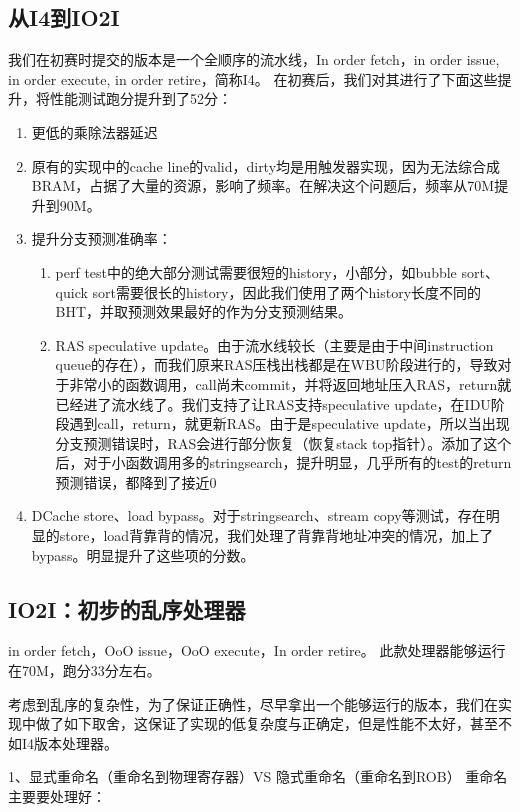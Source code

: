 \documentclass[lang=cn,11pt,a4paper]{elegantpaper}
\begin{document}
\subsection{从I4到IO2I}
我们在初赛时提交的版本是一个全顺序的流水线，In order fetch，in order issue, in order execute, in order retire，简称I4。
在初赛后，我们对其进行了下面这些提升，将性能测试跑分提升到了52分：
\begin{enumerate}

\item 更低的乘除法器延迟
\item 原有的实现中的cache line的valid，dirty均是用触发器实现，因为无法综合成BRAM，占据了大量的资源，影响了频率。在解决这个问题后，频率从70M提升到90M。
\item 提升分支预测准确率：
\begin{enumerate}
	\item perf test中的绝大部分测试需要很短的history，小部分，如bubble sort、quick sort需要很长的history，因此我们使用了两个history长度不同的BHT，并取预测效果最好的作为分支预测结果。
	
	\item RAS speculative update。由于流水线较长（主要是由于中间instruction
	queue的存在），而我们原来RAS压栈出栈都是在WBU阶段进行的，导致对于非常小的函数调用，call尚未commit，并将返回地址压入RAS，return就已经进了流水线了。我们支持了让RAS支持speculative update，在IDU阶段遇到call，return，就更新RAS。由于是speculative update，所以当出现分支预测错误时，RAS会进行部分恢复（恢复stack top指针）。添加了这个后，对于小函数调用多的stringsearch，提升明显，几乎所有的test的return预测错误，都降到了接近0%
\end{enumerate}

\item DCache store、load bypass。对于stringsearch、stream copy等测试，存在明显的store，load背靠背的情况，我们处理了背靠背地址冲突的情况，加上了bypass。明显提升了这些项的分数。
\end{enumerate}

\subsection{IO2I：初步的乱序处理器}
in order fetch，OoO issue，OoO execute，In order retire。
此款处理器能够运行在70M，跑分33分左右。

考虑到乱序的复杂性，为了保证正确性，尽早拿出一个能够运行的版本，我们在实现中做了如下取舍，这保证了实现的低复杂度与正确定，但是性能不太好，甚至不如I4版本处理器。


1、显式重命名（重命名到物理寄存器）VS 隐式重命名（重命名到ROB）
重命名主要要处理好：
\end{document}
